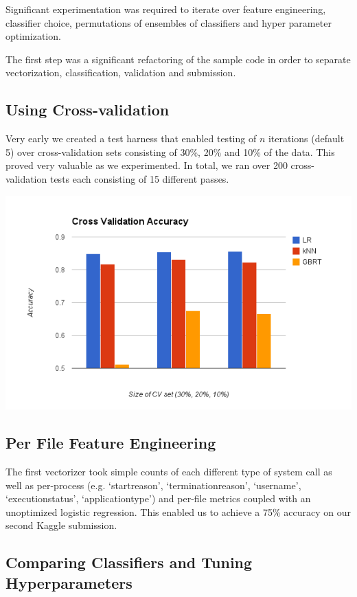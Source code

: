\documentclass[11pt, oneside]{article}   	%
\begin{document}
Significant experimentation was required to iterate over feature engineering, classifier choice, permutations of ensembles of classifiers and hyper parameter optimization.

The first step was a significant refactoring of the sample code in order to separate vectorization, classification, validation and submission.

\subsection*{Using Cross-validation}

Very early we created a test harness that enabled testing of $n$ iterations (default 5) over cross-validation sets consisting of 30\%, 20\% and 10\% of the data. This proved very valuable as we experimented. In total, we ran over 200 cross-validation tests each consisting of 15 different passes.

\includegraphics[scale=.6]{cv_error}


\subsection*{Per File Feature Engineering}

The first vectorizer took simple counts of each different type of system call as well as per-process (e.g. `startreason', `terminationreason', `username', `executionstatus', `applicationtype') and per-file metrics coupled with an unoptimized logistic regression. This enabled us to achieve a 75\% accuracy on our second Kaggle submission.

\subsection*{Comparing Classifiers and Tuning Hyperparameters}
\end{document}
